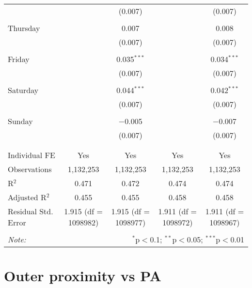 \documentclass[
]{article}
\begin{document}
\begin{table}[!htbp]
{\begin{tabular}{@{\extracolsep{5pt}}lcccc}
  &  & (0.007) &  & (0.007) \\ 
  & & & & \\ 
 Thursday &  & 0.007 &  & 0.008 \\ 
  &  & (0.007) &  & (0.007) \\ 
  & & & & \\ 
 Friday &  & 0.035$^{***}$ &  & 0.034$^{***}$ \\ 
  &  & (0.007) &  & (0.007) \\ 
  & & & & \\ 
 Saturday &  & 0.044$^{***}$ &  & 0.042$^{***}$ \\ 
  &  & (0.007) &  & (0.007) \\ 
  & & & & \\ 
 Sunday &  & $-$0.005 &  & $-$0.007 \\ 
  &  & (0.007) &  & (0.007) \\ 
  & & & & \\ 
\hline \\[-1.8ex] 
Individual FE & Yes & Yes & Yes & Yes \\ 
Observations & 1,132,253 & 1,132,253 & 1,132,253 & 1,132,253 \\ 
R$^{2}$ & 0.471 & 0.472 & 0.474 & 0.474 \\ 
Adjusted R$^{2}$ & 0.455 & 0.455 & 0.458 & 0.458 \\ 
Residual Std. Error & 1.915 (df = 1098982) & 1.915 (df = 1098977) & 1.911 (df = 1098972) & 1.911 (df = 1098967) \\ 
\hline 
\hline \\[-1.8ex] 
\textit{Note:}  & \multicolumn{4}{r}{$^{*}$p$<$0.1; $^{**}$p$<$0.05; $^{***}$p$<$0.01} \\ 
\end{tabular}
} 
\end{table} 
\newpage
\section{Outer proximity vs PA}
\end{document}
